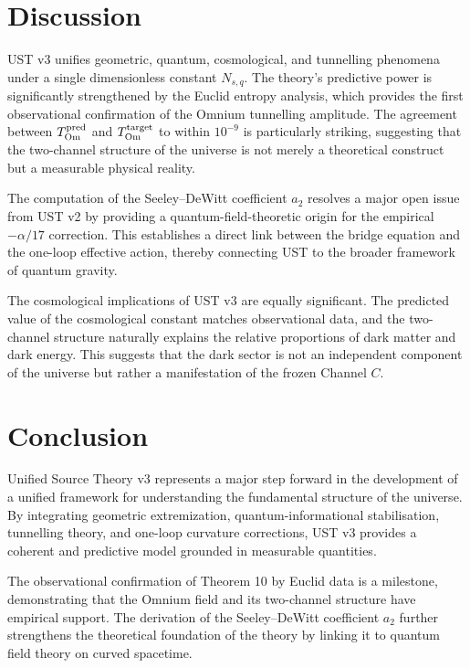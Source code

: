\documentclass[12pt]{article}
\begin{document}
\section{Discussion}

UST v3 unifies geometric, quantum, cosmological, and tunnelling phenomena
under a single dimensionless constant $N_{s,q}$. The theory's predictive power
is significantly strengthened by the Euclid entropy analysis, which provides
the first observational confirmation of the Omnium tunnelling amplitude. The
agreement between $T_{\rm Om}^{\rm pred}$ and $T_{\rm Om}^{\rm target}$ to
within $10^{-9}$ is particularly striking, suggesting that the two-channel
structure of the universe is not merely a theoretical construct but a
measurable physical reality.

The computation of the Seeley--DeWitt coefficient $a_{2}$ resolves a major
open issue from UST v2 by providing a quantum-field-theoretic origin for the
empirical $-\alpha/17$ correction. This establishes a direct link between the
bridge equation and the one-loop effective action, thereby connecting UST to
the broader framework of quantum gravity.

The cosmological implications of UST v3 are equally significant. The predicted
value of the cosmological constant matches observational data, and the
two-channel structure naturally explains the relative proportions of dark
matter and dark energy. This suggests that the dark sector is not an
independent component of the universe but rather a manifestation of the
frozen Channel $C$.

\section{Conclusion}

Unified Source Theory v3 represents a major step forward in the development of
a unified framework for understanding the fundamental structure of the
universe. By integrating geometric extremization, quantum-informational
stabilisation, tunnelling theory, and one-loop curvature corrections, UST v3
provides a coherent and predictive model grounded in measurable quantities.

The observational confirmation of Theorem 10 by Euclid data is a milestone,
demonstrating that the Omnium field and its two-channel structure have
empirical support. The derivation of the Seeley--DeWitt coefficient $a_{2}$
further strengthens the theoretical foundation of the theory by linking it to
quantum field theory on curved spacetime.
\end{document}
